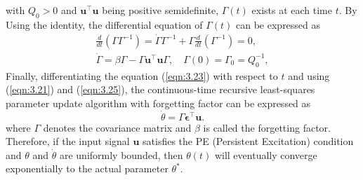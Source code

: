with \( Q_0 > 0 \) and \( \mathbf{u}^\top \mathbf{u} \) being positive semidefinite, \( \Gamma(t) \) exists at each time \( t \). By Using the identity, the differential equation of $\Gamma(t)$ can be expressed as
\begin{equation}
\begin{aligned}
\frac{d}{dt} \left( \Gamma \Gamma^{-1} \right) = \dot{\Gamma} \Gamma^{-1} + \Gamma \frac{d}{dt} \left( \Gamma^{-1} \right) = 0,\\
    \dot{\Gamma} = \beta \Gamma - \Gamma \boldsymbol{u}^\top \boldsymbol{u} \Gamma, \quad \Gamma(0) = \Gamma_0 = Q_0^{-1},
\end{aligned}
\end{equation}
Finally, differentiating the equation (\ref{eqn:3.23}) with respect to \( t \) and using (\ref{eqn:3.21}) and (\ref{eqn:3.25}), the continuous-time recursive least-squares parameter update algorithm with forgetting factor can be expressed as
\begin{equation}
\dot{\theta} = \Gamma \boldsymbol{\epsilon}^\top \boldsymbol{u}. 
\end{equation}
where \(\Gamma\) denotes the covariance matrix and \(\beta\) is called the forgetting factor. Therefore, if the input signal \(\mathbf{u}\) satisfies the PE (Persistent Excitation) condition and \(\theta\) and \(\dot{\theta}\) are uniformly bounded, then \(\theta(t)\) will eventually converge exponentially to the actual parameter \(\theta^*\).